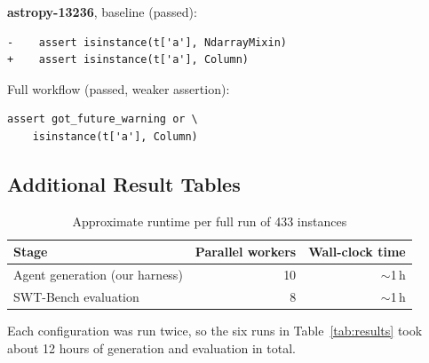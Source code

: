 \documentclass[conference]{IEEEtran}
\begin{document}
\textbf{astropy-13236}, baseline (passed):
{\footnotesize
\begin{verbatim}
-    assert isinstance(t['a'], NdarrayMixin)
+    assert isinstance(t['a'], Column)
\end{verbatim}}
\noindent Full workflow (passed, weaker assertion):
{\footnotesize
\begin{verbatim}
assert got_future_warning or \
    isinstance(t['a'], Column)
\end{verbatim}}

\subsection{Additional Result Tables}
\label{app:tables}

\begin{table}[htbp]
\caption{Approximate runtime per full run of 433 instances}
\label{tab:runtime}
\centering
\begin{tabular}{@{}lrr@{}}
\toprule
\textbf{Stage} & \textbf{Parallel workers} & \textbf{Wall-clock time} \\
\midrule
Agent generation (our harness) & 10 & $\sim$1\,h \\
SWT-Bench evaluation           & 8  & $\sim$1\,h \\
\bottomrule
\end{tabular}
\end{table}

Each configuration was run twice, so the six runs in Table~\ref{tab:results} took about 12 hours of generation and evaluation in total.
\end{document}
